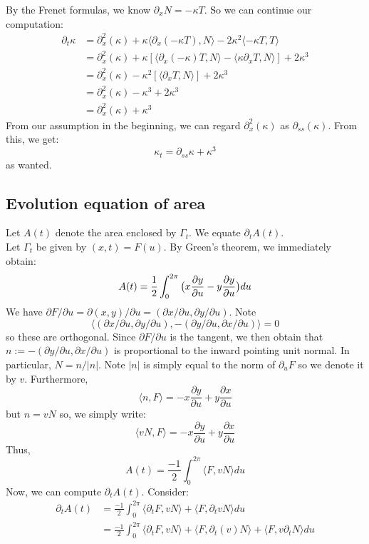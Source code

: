 \documentclass{article}
\begin{document}
By the Frenet formulas, we know $\partial_x N = -\kappa T$. So we can continue our computation:
\begin{align*}
    \partial_t \kappa &= \partial_x^2 (\kappa) + \kappa\langle \partial_x(-\kappa T), N\rangle - 2\kappa^2\langle -\kappa T, T\rangle \\
        &= \partial_x^2 (\kappa) + \kappa[\langle \partial_x (-\kappa)T, N\rangle - \langle \kappa \partial_x T, N\rangle] + 2\kappa^3 \\
        &= \partial_x^2 (\kappa) - \kappa^2[\langle \partial_x T, N\rangle] + 2\kappa^3 \\
        &= \partial_x^2 (\kappa) - \kappa^3 + 2\kappa^3 \\
        &= \partial_x^2 (\kappa) + \kappa^3
\end{align*}
From our assumption in the beginning, we can regard $\partial_x^2 (\kappa)$ as $\partial_{ss} (\kappa)$. From this, we get:
\[ \kappa_t = \partial_{ss} \kappa + \kappa^3 \]
as wanted.

\subsection{Evolution equation of area}

Let $A(t)$ denote the area enclosed by $\Gamma_t$. We equate $\partial_t A(t)$.\\

Let $\Gamma_t$ be given by $(x,t) = F(u)$. By Green's theorem, we immediately obtain:
\[ A(t) = \frac{1}{2} \int_{0}^{2\pi} \big{(}x\frac{\partial y}{\partial u} - y\frac{\partial y}{\partial u}\big{)}du \]
We have $\partial F/\partial u = \partial (x,y) / \partial u = (\partial x/\partial u, \partial y/\partial u)$. Note
\[ \langle (\partial x/\partial u, \partial y/\partial u),-(\partial y/\partial u, \partial x/\partial u)\rangle=0 \]
so these are orthogonal. Since $\partial F/\partial u$ is the tangent, we then obtain that $n := -(\partial y/\partial u, \partial x/\partial u)$ is proportional to the inward pointing unit normal.
In particular, $N = n/|n|$. Note $|n|$ is simply equal to the norm of $\partial_u F$ so we denote it by $v$. Furthermore,
\[ \langle n, F\rangle = -x \frac{\partial y}{\partial u} + y\frac{\partial x}{\partial u} \]
but $n = vN$ so, we simply write:
\[ \langle vN, F\rangle = -x \frac{\partial y}{\partial u} + y\frac{\partial x}{\partial u} \]
Thus,
\[ A(t) = \frac{-1}{2} \int_0^{2\pi} \langle F, vN\rangle du \]
Now, we can compute $\partial_t A(t)$. Consider:
\begin{align*}
    \partial_t A(t) &= \frac{-1}{2} \int_0^{2\pi} \langle \partial_t F, vN\rangle + \langle F, \partial_t vN\rangle du \\
        &= \frac{-1}{2} \int_0^{2\pi} \langle \partial_t F, vN\rangle + \langle F, \partial_t (v)N\rangle +  \langle F, v\partial_t N\rangle du
\end{align*}
\end{document}
